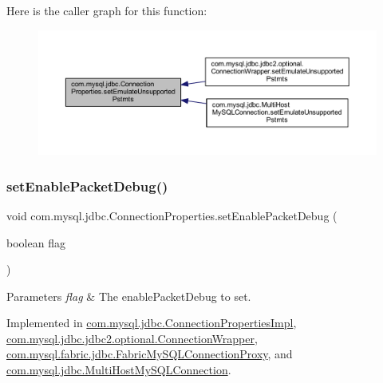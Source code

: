 Here is the caller graph for this function\+:\nopagebreak
\begin{figure}[H]
\begin{center}
\leavevmode
\includegraphics[width=350pt]{interfacecom_1_1mysql_1_1jdbc_1_1_connection_properties_ad1ece011a4fffaed971f9849aa966183_icgraph}
\end{center}
\end{figure}
\mbox{\label{interfacecom_1_1mysql_1_1jdbc_1_1_connection_properties_a544989b319bc9a8c941c8c969011fcb5}} 
\subsubsection{\texorpdfstring{set\+Enable\+Packet\+Debug()}{setEnablePacketDebug()}}
{\footnotesize\ttfamily void com.\+mysql.\+jdbc.\+Connection\+Properties.\+set\+Enable\+Packet\+Debug (\begin{DoxyParamCaption}\item[{boolean}]{flag }\end{DoxyParamCaption})}


\begin{DoxyParams}{Parameters}
{\em flag} & The enable\+Packet\+Debug to set. \\
\hline
\end{DoxyParams}


Implemented in \mbox{\hyperlink{classcom_1_1mysql_1_1jdbc_1_1_connection_properties_impl_a0ae3082906adfaa1abbc22bfb8ca865f}{com.\+mysql.\+jdbc.\+Connection\+Properties\+Impl}}, \mbox{\hyperlink{classcom_1_1mysql_1_1jdbc_1_1jdbc2_1_1optional_1_1_connection_wrapper_a8aa46e9a081e1832ae682449584a218e}{com.\+mysql.\+jdbc.\+jdbc2.\+optional.\+Connection\+Wrapper}}, \mbox{\hyperlink{classcom_1_1mysql_1_1fabric_1_1jdbc_1_1_fabric_my_s_q_l_connection_proxy_a41aa817b36c29f6f77757f146ba92b88}{com.\+mysql.\+fabric.\+jdbc.\+Fabric\+My\+S\+Q\+L\+Connection\+Proxy}}, and \mbox{\hyperlink{classcom_1_1mysql_1_1jdbc_1_1_multi_host_my_s_q_l_connection_a08ebf87d3511967776a8f2047453f72b}{com.\+mysql.\+jdbc.\+Multi\+Host\+My\+S\+Q\+L\+Connection}}.

